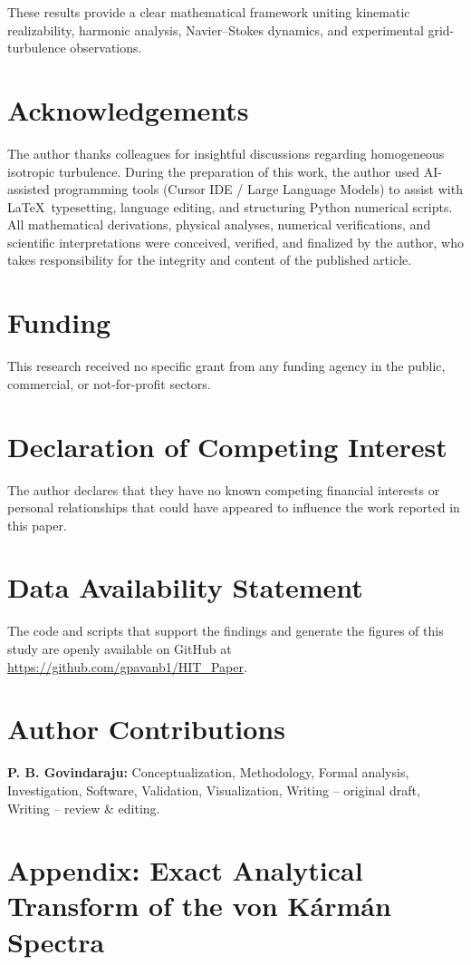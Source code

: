 \documentclass[lineno]{jfm}
\begin{document}
These results provide a clear mathematical framework uniting kinematic realizability, harmonic analysis, Navier--Stokes dynamics, and experimental grid-turbulence observations.

\section*{Acknowledgements}
The author thanks colleagues for insightful discussions regarding homogeneous isotropic turbulence. During the preparation of this work, the author used AI-assisted programming tools (Cursor IDE / Large Language Models) to assist with \LaTeX\ typesetting, language editing, and structuring Python numerical scripts. All mathematical derivations, physical analyses, numerical verifications, and scientific interpretations were conceived, verified, and finalized by the author, who takes responsibility for the integrity and content of the published article.

\section*{Funding}
This research received no specific grant from any funding agency in the public, commercial, or not-for-profit sectors.

\section*{Declaration of Competing Interest}
The author declares that they have no known competing financial interests or personal relationships that could have appeared to influence the work reported in this paper.

\section*{Data Availability Statement}
The code and scripts that support the findings and generate the figures of this study are openly available on GitHub at \url{https://github.com/gpavanb1/HIT_Paper}.

\section*{Author Contributions}
\textbf{P. B. Govindaraju:} Conceptualization, Methodology, Formal analysis, Investigation, Software, Validation, Visualization, Writing -- original draft, Writing -- review \& editing.

\appendix
\section*{Appendix: Exact Analytical Transform of the von K\'arm\'an Spectra}
\renewcommand{\thesubsection}{A.\arabic{subsection}}
\renewcommand{\theequation}{A.\arabic{equation}}
\setcounter{equation}{0}
\setcounter{subsection}{0}
\label{app:von_karman_derivation}
\end{document}

